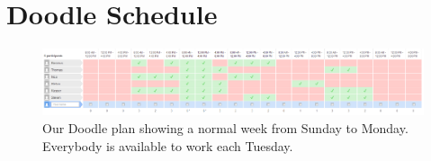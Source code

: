 \section{Doodle Schedule} \label{sec:appendix-doodle-schedule}

\begin{figure}[ht]
\centering
\includegraphics[width=\columnwidth]{images/doodle-plan.png}
\caption{Our Doodle plan showing a normal week from Sunday to Monday. Everybody is available to work each Tuesday.}
\label{fig:appendix-doodle-schedule}
\end{figure}

